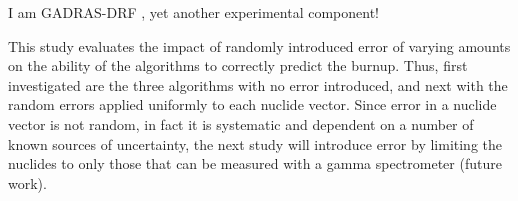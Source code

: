 I am \gls{GADRAS-DRF} \cite{gadras}, yet another experimental component!

This study evaluates the impact of randomly introduced error of varying amounts
on the ability of the algorithms to correctly predict the burnup. Thus, first
investigated are the three algorithms with no error introduced, and next with
the random errors applied uniformly to each nuclide vector. Since error in a
nuclide vector is not random, in fact it is systematic and dependent on a
number of known sources of uncertainty, the next study will introduce error by
limiting the nuclides to only those that can be measured with a gamma
spectrometer (future work).


